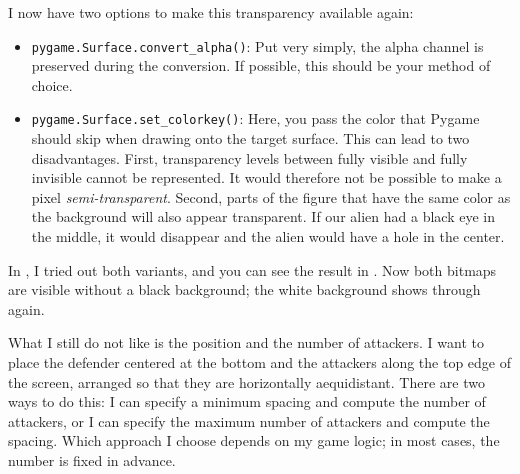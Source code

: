 I now have two options to make this transparency available again:
\begin{hintbox}
\begin{itemize}
	\item \texttt{pygame.Surface.convert\_alpha()}: Put very simply, the alpha channel is preserved during the
	conversion.	If possible, this should be your method of choice.
	
	\item \texttt{pygame.Surface.set\_colorkey()}: Here, you pass the color that Pygame should skip when drawing onto the target surface. This can lead to two disadvantages. First, transparency levels between fully visible and fully invisible cannot be represented. It would therefore not be possible to make a pixel \emph{semi-transparent}. Second, parts of the figure that have the same color as the background will also appear transparent. If our alien had a black eye in the middle, it would disappear and the alien would have a hole in the center.
\end{itemize}
\end{hintbox}



\begin{figure}
\end{figure}In , I tried out both variants, and you can see the result in . Now both bitmaps are visible without a black background; the white background shows through again.

What I still do not like is the position and the number of attackers. I want to place the defender centered at the bottom and the attackers along the top edge of the screen, arranged so that they are horizontally \gls{aequidistant}. There are two ways to do this: I can specify a minimum spacing and compute the number of attackers, or I can specify the maximum number of attackers and compute the spacing. Which approach I choose depends on my game logic; in most cases, the number is fixed in advance.


